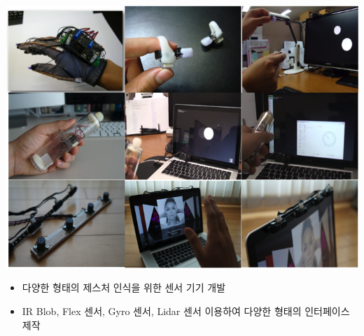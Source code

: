 \begin{cventries}
{\begin{cvitems}
{          \includegraphics[width=\linewidth]{cv/resources/gesturedevices.png}
          \begin{itemize}
            \item {다양한 형태의 제스처 인식을 위한 센서 기기 개발}
            \item {IR Blob, Flex 센서, Gyro 센서, Lidar 센서 이용하여 다양한 형태의 인터페이스 제작}
          \end{itemize}
        }
      \end{cvitems} 
    }

\end{cventries}

